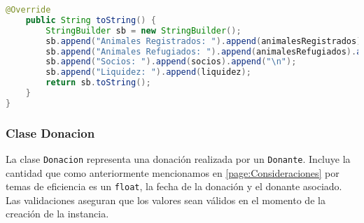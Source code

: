 \begin{lstlisting}[style = javaNormal, language=Java]
    @Override
    public String toString() {
        StringBuilder sb = new StringBuilder();
        sb.append("Animales Registrados: ").append(animalesRegistrados).append("\n");
        sb.append("Animales Refugiados: ").append(animalesRefugiados).append("\n");
        sb.append("Socios: ").append(socios).append("\n");
        sb.append("Liquidez: ").append(liquidez);
        return sb.toString();
    }
}
\end{lstlisting}



\subsubsection{Clase Donacion}\label{codigo:donacion}
La clase \texttt{Donacion} representa una donación realizada por un \texttt{Donante}. 
Incluye la cantidad que como anteriormente mencionamos en \ref{page:Consideraciones} por temas de eficiencia es un \texttt{float},
la fecha de la donación y el donante asociado. Las validaciones 
aseguran que los valores sean válidos en el momento de la creación de la instancia.

